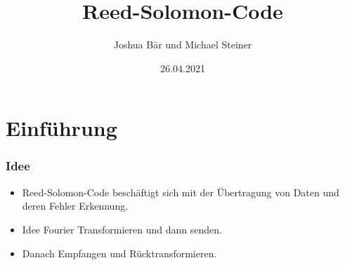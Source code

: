 \documentclass[11pt,aspectratio=169]{beamer}
\begin{document}
	\author{Joshua Bär und Michael Steiner}
	\title{Reed-Solomon-Code}
	\subtitle{}
	\logo{}
	\date{26.04.2021}
	\subject{Mathematisches Seminar}
	\begin{frame}[plain]
		\maketitle
	\end{frame}
	\section{Einführung}
	\begin{frame}
		\frametitle{Idee}
		\begin{itemize}
		\item Reed-Solomon-Code beschäftigt sich mit der Übertragung von Daten
		und deren Fehler Erkennung.
		\item Idee Fourier Transformieren und dann senden.
		\item Danach Empfangen und Rücktransformieren.
		\end{itemize}
	\end{frame}
\end{document}
